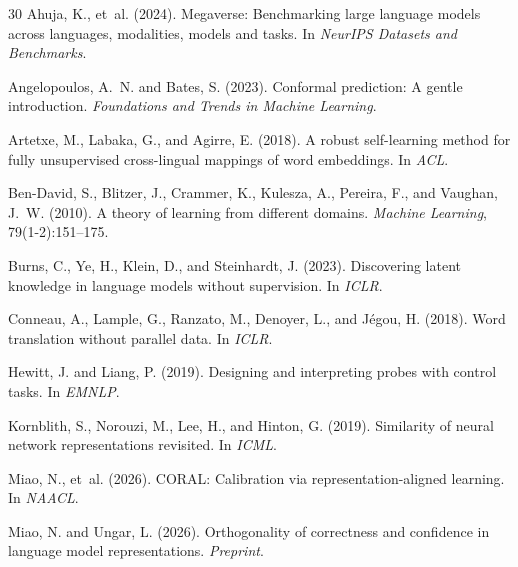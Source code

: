 \documentclass[11pt,a4paper]{article}
\begin{document}
\begin{thebibliography}{30}
Ahuja, K., et~al. (2024).
\newblock Megaverse: Benchmarking large language models across languages, modalities, models and tasks.
\newblock In \emph{NeurIPS Datasets and Benchmarks}.

Angelopoulos, A.~N. and Bates, S. (2023).
\newblock Conformal prediction: A gentle introduction.
\newblock \emph{Foundations and Trends in Machine Learning}.

Artetxe, M., Labaka, G., and Agirre, E. (2018).
\newblock A robust self-learning method for fully unsupervised cross-lingual mappings of word embeddings.
\newblock In \emph{ACL}.

Ben-David, S., Blitzer, J., Crammer, K., Kulesza, A., Pereira, F., and Vaughan, J.~W. (2010).
\newblock A theory of learning from different domains.
\newblock \emph{Machine Learning}, 79(1-2):151--175.

Burns, C., Ye, H., Klein, D., and Steinhardt, J. (2023).
\newblock Discovering latent knowledge in language models without supervision.
\newblock In \emph{ICLR}.

Conneau, A., Lample, G., Ranzato, M., Denoyer, L., and J{\'e}gou, H. (2018).
\newblock Word translation without parallel data.
\newblock In \emph{ICLR}.

Hewitt, J. and Liang, P. (2019).
\newblock Designing and interpreting probes with control tasks.
\newblock In \emph{EMNLP}.

Kornblith, S., Norouzi, M., Lee, H., and Hinton, G. (2019).
\newblock Similarity of neural network representations revisited.
\newblock In \emph{ICML}.

Miao, N., et~al. (2026).
\newblock CORAL: Calibration via representation-aligned learning.
\newblock In \emph{NAACL}.

Miao, N. and Ungar, L. (2026).
\newblock Orthogonality of correctness and confidence in language model representations.
\newblock \emph{Preprint}.


\end{thebibliography}
\end{document}
